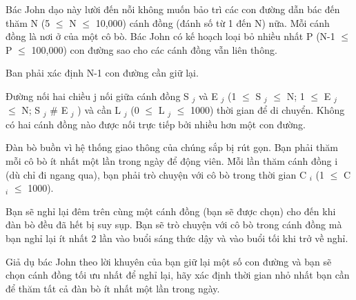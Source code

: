 Bác John dạo này lười đến nỗi không muốn bảo trì các con đường dẫn bác đến thăm N (5  $\le$  N  $\le$  10,000) cánh đồng (đánh số từ 1 đến N) nữa. Mỗi cánh đồng là nơi ở của một cô bò. Bác John có kế hoạch loại bỏ nhiều nhất P (N-1  $\le$  P  $\le$  100,000) con đường sao cho các cánh đồng vẫn liên thông.  

   Ban phải xác định N-1 con đường cần giữ lại.  

   Đường nối hai chiều j nối giữa cánh đồng S   $_    j   $   và E   $_    j   $   (1  $\le$  S   $_    j   $    $\le$  N; 1  $\le$  E   $_    j   $    $\le$  N; S   $_    j   $   \# E   $_    j   $   ) và cần L   $_    j   $   (0  $\le$  L   $_    j   $    $\le$  1000) thời gian để di chuyển. Không có hai cánh đồng nào được nối trực tiếp bởi nhiều hơn một con đường.  

   Đàn bò buồn vì hệ thống giao thông của chúng sắp bị rút gọn. Bạn phải thăm mỗi cô bò ít nhất một lần trong ngày để động viên. Mỗi lần thăm cánh đồng i (dù chỉ đi ngang qua), bạn phải trò chuyện với cô bò trong thời gian C   $_    i   $   (1  $\le$  C   $_    i   $    $\le$  1000).  

   Bạn sẽ nghỉ lại đêm trên cùng một cánh đồng (bạn sẽ được chọn) cho đến khi đàn bò đều đã hết bị suy sụp. Bạn sẽ trò chuyện với cô bò trong cánh đồng mà bạn nghỉ lại ít nhất 2 lần vào buổi sáng thức dậy và vào buổi tối khi trở về nghỉ.  

   Giả dụ bác John theo lời khuyên của bạn giữ lại một số con đường và bạn sẽ chọn cánh đồng tối ưu nhất để nghỉ lại, hãy xác định thời gian nhỏ nhất bạn cần để thăm tất cả đàn bò ít nhất một lần trong ngày.